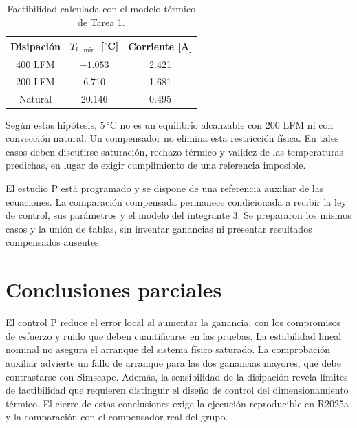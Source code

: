 \begin{table}[!tbp]\centering
\caption{Factibilidad calculada con el modelo térmico de Tarea 1.}
\label{tab:factibilidad}
\footnotesize
\begin{tabular}{@{}ccc@{}}\toprule
Disipación&$T_{b,\min}$ [$^\circ$C]&Corriente [A]\\\midrule
400 LFM&$-1.053$&2.421\\
200 LFM&6.710&1.681\\
Natural&20.146&0.495\\\bottomrule
\end{tabular}
\end{table}
Según estas hipótesis, $5\,{}^\circ\mathrm C$ no es un equilibrio alcanzable con 200 LFM ni con convección natural. Un compensador no elimina esta restricción física. En tales casos deben discutirse saturación, rechazo térmico y validez de las temperaturas predichas, en lugar de exigir cumplimiento de una referencia imposible.

El estudio P está programado y se dispone de una referencia auxiliar de las ecuaciones. La comparación compensada permanece condicionada a recibir la ley de control, sus parámetros y el modelo del integrante 3. Se prepararon los mismos casos y la unión de tablas, sin inventar ganancias ni presentar resultados compensados ausentes.

\section{Conclusiones parciales}
El control P reduce el error local al aumentar la ganancia, con los compromisos de esfuerzo y ruido que deben cuantificarse en las pruebas. La estabilidad lineal nominal no asegura el arranque del sistema físico saturado. La comprobación auxiliar advierte un fallo de arranque para las dos ganancias mayores, que debe contrastarse con Simscape. Además, la sensibilidad de la disipación revela límites de factibilidad que requieren distinguir el diseño de control del dimensionamiento térmico. El cierre de estas conclusiones exige la ejecución reproducible en R2025a y la comparación con el compensador real del grupo.
